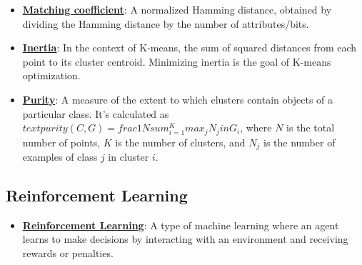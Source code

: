 \documentclass{article}%
\begin{document}
\begin{itemize}[leftmargin=*]
\item \href{https://purdue.brightspace.com/d2l/common/assets/pdfjs-d2l-dist/1.0.14-legacy/web/viewer.html?file=\%2Fcontent\%2Fenforced\%2F1095467-wl.202510.CS.24300.001\%2F12L2-distance-clusters.pdf\%3Fou\%3D1095467\&lang=en-us\&container=d2l-fileviewer-rendered-pdf\&fullscreen=d2l-fileviewer-rendered-pdf-dialog\&height=667#page=19}{\textbf{Matching coefficient}}: A normalized Hamming distance, obtained by dividing the Hamming distance by the number of attributes/bits.%
\item \href{https://purdue.brightspace.com/d2l/common/assets/pdfjs-d2l-dist/1.0.14-legacy/web/viewer.html?file=\%2Fcontent\%2Fenforced\%2F1095467-wl.202510.CS.24300.001\%2F12L2-distance-clusters.pdf\%3Fou\%3D1095467\&lang=en-us\&container=d2l-fileviewer-rendered-pdf\&fullscreen=d2l-fileviewer-rendered-pdf-dialog\&height=667#page=33}{\textbf{Inertia}}: In the context of K-means, the sum of squared distances from each point to its cluster centroid. Minimizing inertia is the goal of K-means optimization.%
\item \href{https://purdue.brightspace.com/d2l/common/assets/pdfjs-d2l-dist/1.0.14-legacy/web/viewer.html?file=\%2Fcontent\%2Fenforced\%2F1095467-wl.202510.CS.24300.001\%2F12L2-distance-clusters.pdf\%3Fou\%3D1095467\&lang=en-us\&container=d2l-fileviewer-rendered-pdf\&fullscreen=d2l-fileviewer-rendered-pdf-dialog\&height=667#page=44}{\textbf{Purity}}: A measure of the extent to which clusters contain objects of a particular class. It's calculated as $ text{purity}(C, G) =  frac{1}{N}  sum_{i=1}^{K}  max_j N_j  in G_i$, where $N$ is the total number of points, $K$ is the number of clusters, and $N_j$ is the number of examples of class $j$ in cluster $i$.%
\end{itemize}

%
\subsection{Reinforcement Learning}%
\label{subsec:ReinforcementLearning}%
\begin{itemize}[leftmargin=*]%
\item \href{https://purdue.brightspace.com/d2l/common/assets/pdfjs-d2l-dist/1.0.14-legacy/web/viewer.html?file=\%2Fcontent\%2Fenforced\%2F1095467-wl.202510.CS.24300.001\%2F02L2-Intro.pdf\%3Fou\%3D1095467\&lang=en-us\&container=d2l-fileviewer-rendered-pdf\&fullscreen=d2l-fileviewer-rendered-pdf-dialog\&height=667#page=46}{\textbf{Reinforcement Learning}}: A type of machine learning where an agent learns to make decisions by interacting with an environment and receiving rewards or penalties.%
\end{itemize}
\end{document}
